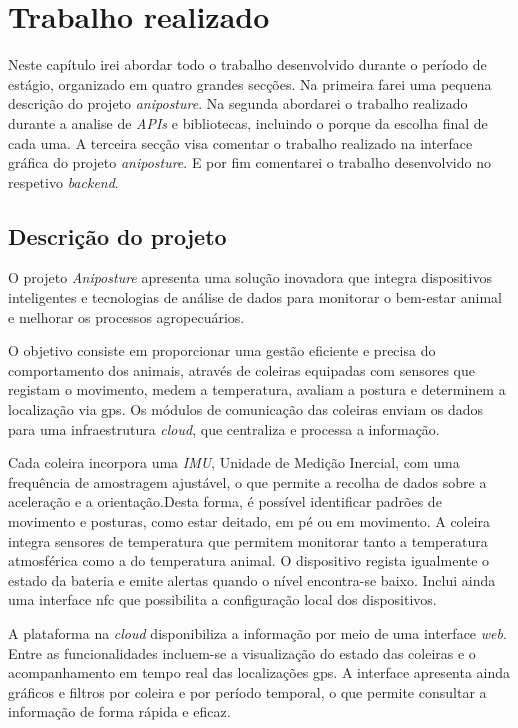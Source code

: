 \chapter{Trabalho realizado}
\label{chapter:work-done}

\begin{introduction}
    Neste capítulo irei abordar todo o trabalho desenvolvido durante o período de estágio, organizado em quatro grandes secções. Na primeira farei uma pequena descrição do projeto \textit{aniposture}. Na segunda abordarei o trabalho realizado durante a analise de \textit{APIs} e bibliotecas, incluindo o porque da escolha final de cada uma. A terceira secção visa comentar o trabalho realizado na interface gráfica do projeto \textit{aniposture}. E por fim comentarei o trabalho desenvolvido no respetivo \textit{backend}.
\end{introduction}

\section{Descrição do projeto}\label{sec:project} %
O projeto \textit{Aniposture} apresenta uma solução inovadora que integra dispositivos inteligentes e tecnologias de análise de dados para monitorar o bem-estar animal e melhorar os processos agropecuários. 

O objetivo consiste em proporcionar uma gestão eficiente e precisa do comportamento dos animais, através de coleiras equipadas com sensores que registam o movimento, medem a temperatura, avaliam a postura e determinem a localização via \acs{gps}. Os módulos de comunicação das coleiras enviam os dados para uma infraestrutura \textit{cloud}, que centraliza e processa a informação.

Cada coleira incorpora uma \textit{IMU}, Unidade de Medição Inercial, com uma frequência de amostragem ajustável, o que permite a recolha de dados sobre a aceleração e a orientação.Desta forma, é possível identificar padrões de movimento e posturas, como estar deitado, em pé ou em movimento. A coleira integra sensores de temperatura que permitem monitorar tanto a temperatura atmosférica como a do temperatura animal. O dispositivo regista igualmente o estado da bateria e emite alertas quando o nível encontra-se baixo. Inclui ainda uma interface \acs{nfc} que possibilita a configuração local dos dispositivos.

A plataforma na \textit{cloud} disponibiliza a informação por meio de uma interface \textit{web}. Entre as funcionalidades incluem-se a visualização do estado das coleiras e o acompanhamento em tempo real das localizações \acs{gps}. A interface apresenta ainda gráficos e filtros por coleira e por período temporal, o que permite consultar a informação de forma rápida e eficaz.

